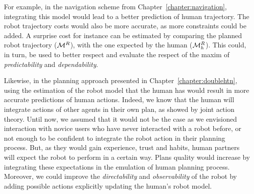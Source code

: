 \documentclass[a4paper,11pt,twoside]{StyleThese}
\begin{document}
For example, in the navigation scheme from Chapter~\ref{chapter:navigation}, integrating this model would lead to a better prediction of human trajectory. The robot trajectory costs would also be more accurate, as more constraints could be added. A surprise cost for instance can be estimated by comparing the planned robot trajectory ($\mathcal{M}^R$), with the one expected by the human ($\mathcal{M}^R_h$). This could, in turn, be used to better respect and evaluate the respect of the maxim of \textit{predictability} and \textit{dependability}.

Likewise, in the planning approach presented in Chapter~\ref{chapter:doublehtn}, using the estimation of the robot model that the human has would result in more accurate predictions of human actions. Indeed, we know that the human will integrate actions of other agents in their own plan, as showed by joint action theory. Until now, we assumed that it would not be the case as we envisioned interaction with novice users who have never interacted with a robot before, or not enough to be confident to integrate the robot action in their planning process. But, as they would gain experience, trust and habits, human partners will expect the robot to perform in a certain way. Plans quality would increase by integrating these expectations in the emulation of human planning process. Moreover, we could improve the \textit{directability} and \textit{observability} of the robot by adding possible actions explicitly updating the human's robot model.


\ifdefined{}
\else


\end{document}
